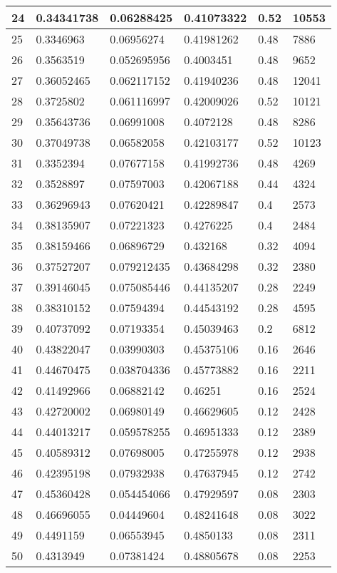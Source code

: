 \begin{longtable}{|l|l|l|l|l|l|}
24 & 0.34341738 & 0.06288425 & 0.41073322 & 0.52 & 10553 \\ \hline 
25 & 0.3346963 & 0.06956274 & 0.41981262 & 0.48 & 7886 \\ \hline 
26 & 0.3563519 & 0.052695956 & 0.4003451 & 0.48 & 9652 \\ \hline 
27 & 0.36052465 & 0.062117152 & 0.41940236 & 0.48 & 12041 \\ \hline 
28 & 0.3725802 & 0.061116997 & 0.42009026 & 0.52 & 10121 \\ \hline 
29 & 0.35643736 & 0.06991008 & 0.4072128 & 0.48 & 8286 \\ \hline 
30 & 0.37049738 & 0.06582058 & 0.42103177 & 0.52 & 10123 \\ \hline 
31 & 0.3352394 & 0.07677158 & 0.41992736 & 0.48 & 4269 \\ \hline 
32 & 0.3528897 & 0.07597003 & 0.42067188 & 0.44 & 4324 \\ \hline 
33 & 0.36296943 & 0.07620421 & 0.42289847 & 0.4 & 2573 \\ \hline 
34 & 0.38135907 & 0.07221323 & 0.4276225 & 0.4 & 2484 \\ \hline 
35 & 0.38159466 & 0.06896729 & 0.432168 & 0.32 & 4094 \\ \hline 
36 & 0.37527207 & 0.079212435 & 0.43684298 & 0.32 & 2380 \\ \hline 
37 & 0.39146045 & 0.075085446 & 0.44135207 & 0.28 & 2249 \\ \hline 
38 & 0.38310152 & 0.07594394 & 0.44543192 & 0.28 & 4595 \\ \hline 
39 & 0.40737092 & 0.07193354 & 0.45039463 & 0.2 & 6812 \\ \hline 
40 & 0.43822047 & 0.03990303 & 0.45375106 & 0.16 & 2646 \\ \hline 
41 & 0.44670475 & 0.038704336 & 0.45773882 & 0.16 & 2211 \\ \hline 
42 & 0.41492966 & 0.06882142 & 0.46251 & 0.16 & 2524 \\ \hline 
43 & 0.42720002 & 0.06980149 & 0.46629605 & 0.12 & 2428 \\ \hline 
44 & 0.44013217 & 0.059578255 & 0.46951333 & 0.12 & 2389 \\ \hline 
45 & 0.40589312 & 0.07698005 & 0.47255978 & 0.12 & 2938 \\ \hline 
46 & 0.42395198 & 0.07932938 & 0.47637945 & 0.12 & 2742 \\ \hline 
47 & 0.45360428 & 0.054454066 & 0.47929597 & 0.08 & 2303 \\ \hline 
48 & 0.46696055 & 0.04449604 & 0.48241648 & 0.08 & 3022 \\ \hline 
49 & 0.4491159 & 0.06553945 & 0.4850133 & 0.08 & 2311 \\ \hline 
50 & 0.4313949 & 0.07381424 & 0.48805678 & 0.08 & 2253 \\ \hline 
\end{longtable}